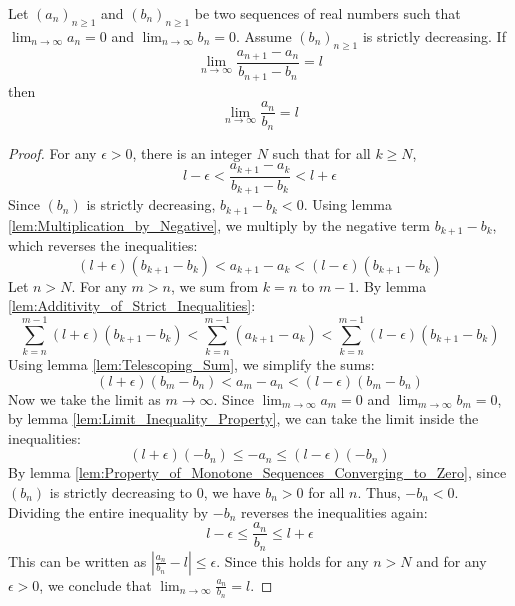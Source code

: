 \begin{theorem}
    \label{thm:Stolz-Cesaro_Theorem_for_the_0_case}
    Let $(a_n)_{n\geq 1}$ and $(b_n)_{n\geq 1}$ be two sequences of real numbers such that $\lim_{n\to\infty} a_n = 0$ and $\lim_{n\to\infty} b_n = 0$. Assume $(b_n)_{n\geq 1}$ is strictly decreasing. If
    $$\lim_{n\to\infty} \frac{a_{n+1}-a_n}{b_{n+1}-b_n} = l$$
    then
    $$\lim_{n\to\infty} \frac{a_n}{b_n} = l$$
\end{theorem}
\begin{proof}
    For any $\epsilon > 0$, there is an integer $N$ such that for all $k \geq N$,
    $$l - \epsilon < \frac{a_{k+1}-a_k}{b_{k+1}-b_k} < l + \epsilon$$
    Since $(b_n)$ is strictly decreasing, $b_{k+1}-b_k < 0$. Using lemma \ref{lem:Multiplication_by_Negative}, we multiply by the negative term $b_{k+1}-b_k$, which reverses the inequalities:
    $$(l+\epsilon)(b_{k+1}-b_k) < a_{k+1}-a_k < (l-\epsilon)(b_{k+1}-b_k)$$
    Let $n > N$. For any $m > n$, we sum from $k=n$ to $m-1$. By lemma \ref{lem:Additivity_of_Strict_Inequalities}:
    $$\sum_{k=n}^{m-1} (l+\epsilon)(b_{k+1}-b_k) < \sum_{k=n}^{m-1} (a_{k+1}-a_k) < \sum_{k=n}^{m-1} (l-\epsilon)(b_{k+1}-b_k)$$
    Using lemma \ref{lem:Telescoping_Sum}, we simplify the sums:
    $$(l+\epsilon)(b_m-b_n) < a_m-a_n < (l-\epsilon)(b_m-b_n)$$
    Now we take the limit as $m \to \infty$. Since $\lim_{m\to\infty} a_m = 0$ and $\lim_{m\to\infty} b_m = 0$, by lemma \ref{lem:Limit_Inequality_Property}, we can take the limit inside the inequalities:
    $$(l+\epsilon)(-b_n) \leq -a_n \leq (l-\epsilon)(-b_n)$$
    By lemma \ref{lem:Property_of_Monotone_Sequences_Converging_to_Zero}, since $(b_n)$ is strictly decreasing to 0, we have $b_n > 0$ for all $n$. Thus, $-b_n < 0$. Dividing the entire inequality by $-b_n$ reverses the inequalities again:
    $$l-\epsilon \leq \frac{a_n}{b_n} \leq l+\epsilon$$
    This can be written as $|\frac{a_n}{b_n} - l| \leq \epsilon$. Since this holds for any $n>N$ and for any $\epsilon > 0$, we conclude that $\lim_{n\to\infty} \frac{a_n}{b_n} = l$.
\end{proof}
